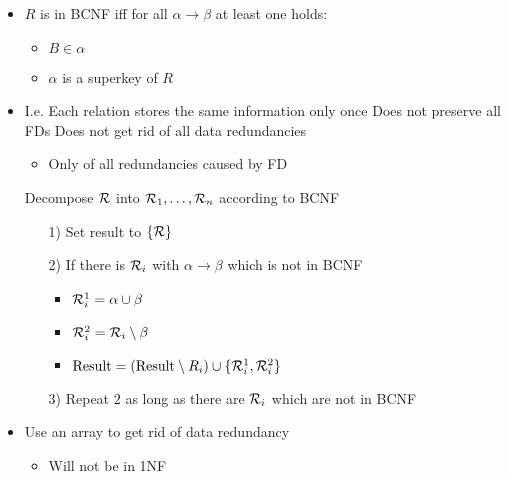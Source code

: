 \begin{itemize}
\begin{itemize}
        \end{itemize}
        \begin{itemize}
            \item $R$ is in BCNF iff for all $\alpha \to \beta$ at least one holds:
                \begin{itemize}
                    \item $B \in \alpha$
                    \item $\alpha$ is a superkey of $R$
                \end{itemize}
            \item I.e. Each relation stores the same information only once
            \icon Does not preserve all FDs
            \icon Does not get rid of all data redundancies
                \begin{itemize}
                    \item Only of all redundancies caused by FD
                \end{itemize}
             Decompose $\mathcal{R}$ into $\mathcal{R}_1, \dots, \mathcal{R}_n$ according to BCNF
                \begin{itemize}
                    \item[1)] Set result to $\{\mathcal{R}\}$
                    \item[2)] If there is $\mathcal{R}_i$ with $\alpha \to \beta$ which is not in BCNF
                        \begin{itemize}
                            \item $\mathcal{R}^1_i = \alpha \cup \beta$
                            \item $\mathcal{R}^2_i = \mathcal{R}_i \setminus \beta$
                            \item $\text{Result} = (\text{Result} \setminus R_i) \cup \{\mathcal{R}^1_i, \mathcal{R}^2_i\}$
                        \end{itemize}
                    \item[3)] Repeat $2$ as long as there are $\mathcal{R}_i$ which are not in BCNF
                \end{itemize}
        \end{itemize}
        \begin{itemize}
            \item Use an array to get rid of data redundancy
                \begin{itemize}
                    \item Will not be in 1NF

\end{itemize}
\end{itemize}
\end{itemize}
